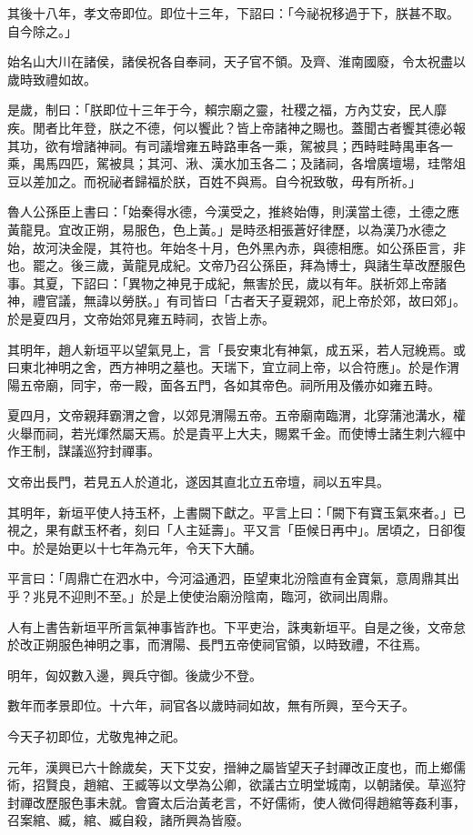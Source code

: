 \begin{pinyinscope}
其後十八年，孝文帝即位。即位十三年，下詔曰：「今祕祝移過于下，朕甚不取。自今除之。」

始名山大川在諸侯，諸侯祝各自奉祠，天子官不領。及齊、淮南國廢，令太祝盡以歲時致禮如故。

是歲，制曰：「朕即位十三年于今，賴宗廟之靈，社稷之福，方內艾安，民人靡疾。閒者比年登，朕之不德，何以饗此？皆上帝諸神之賜也。蓋聞古者饗其德必報其功，欲有增諸神祠。有司議增雍五畤路車各一乘，駕被具；西畤畦畤禺車各一乘，禺馬四匹，駕被具；其河、湫、漢水加玉各二；及諸祠，各增廣壇場，珪幣俎豆以差加之。而祝祕者歸福於朕，百姓不與焉。自今祝致敬，毋有所祈。」

魯人公孫臣上書曰：「始秦得水德，今漢受之，推終始傳，則漢當土德，土德之應黃龍見。宜改正朔，易服色，色上黃。」是時丞相張蒼好律歷，以為漢乃水德之始，故河決金隄，其符也。年始冬十月，色外黑內赤，與德相應。如公孫臣言，非也。罷之。後三歲，黃龍見成紀。文帝乃召公孫臣，拜為博士，與諸生草改歷服色事。其夏，下詔曰：「異物之神見于成紀，無害於民，歲以有年。朕祈郊上帝諸神，禮官議，無諱以勞朕。」有司皆曰「古者天子夏親郊，祀上帝於郊，故曰郊」。於是夏四月，文帝始郊見雍五畤祠，衣皆上赤。

其明年，趙人新垣平以望氣見上，言「長安東北有神氣，成五采，若人冠絻焉。或曰東北神明之舍，西方神明之墓也。天瑞下，宜立祠上帝，以合符應」。於是作渭陽五帝廟，同宇，帝一殿，面各五門，各如其帝色。祠所用及儀亦如雍五畤。

夏四月，文帝親拜霸渭之會，以郊見渭陽五帝。五帝廟南臨渭，北穿蒲池溝水，權火舉而祠，若光煇然屬天焉。於是貴平上大夫，賜累千金。而使博士諸生刺六經中作王制，謀議巡狩封禪事。

文帝出長門，若見五人於道北，遂因其直北立五帝壇，祠以五牢具。

其明年，新垣平使人持玉杯，上書闕下獻之。平言上曰：「闕下有寶玉氣來者。」已視之，果有獻玉杯者，刻曰「人主延壽」。平又言「臣候日再中」。居頃之，日卻復中。於是始更以十七年為元年，令天下大酺。

平言曰：「周鼎亡在泗水中，今河溢通泗，臣望東北汾陰直有金寶氣，意周鼎其出乎？兆見不迎則不至。」於是上使使治廟汾陰南，臨河，欲祠出周鼎。

人有上書告新垣平所言氣神事皆詐也。下平吏治，誅夷新垣平。自是之後，文帝怠於改正朔服色神明之事，而渭陽、長門五帝使祠官領，以時致禮，不往焉。

明年，匈奴數入邊，興兵守御。後歲少不登。

數年而孝景即位。十六年，祠官各以歲時祠如故，無有所興，至今天子。

今天子初即位，尤敬鬼神之祀。

元年，漢興已六十餘歲矣，天下艾安，搢紳之屬皆望天子封禪改正度也，而上鄉儒術，招賢良，趙綰、王臧等以文學為公卿，欲議古立明堂城南，以朝諸侯。草巡狩封禪改歷服色事未就。會竇太后治黃老言，不好儒術，使人微伺得趙綰等姦利事，召案綰、臧，綰、臧自殺，諸所興為皆廢。


\end{pinyinscope}

